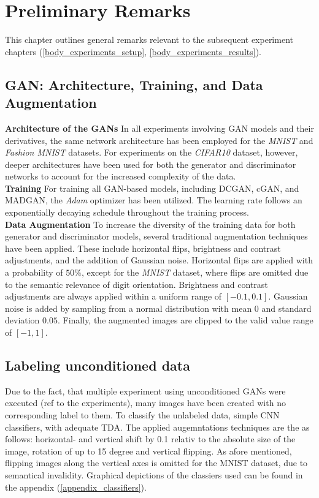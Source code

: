 \section{Preliminary Remarks}\label{body_prelim}
This chapter outlines general remarks relevant to the subsequent experiment chapters (\ref{body_experiments_setup}, \ref{body_experiments_results}).

\subsection{GAN: Architecture, Training, and Data Augmentation}

\noindent\textbf{Architecture of the GANs}
In all experiments involving GAN models and their derivatives, the same network architecture has been employed for the \textit{MNIST} and \textit{Fashion MNIST} datasets. For experiments on the \textit{CIFAR10} dataset, however, deeper architectures have been used for both the generator and discriminator networks to account for the increased complexity of the data.\\

\noindent\textbf{Training}
For training all GAN-based models, including DCGAN, cGAN, and MADGAN, the \textit{Adam} optimizer has been utilized. The learning rate follows an exponentially decaying schedule throughout the training process.\\

\noindent\textbf{Data Augmentation}
To increase the diversity of the training data for both generator and discriminator models, several traditional augmentation techniques have been applied. These include horizontal flips, brightness and contrast adjustments, and the addition of Gaussian noise.
Horizontal flips are applied with a probability of \(50\%\), except for the \textit{MNIST} dataset, where flips are omitted due to the semantic relevance of digit orientation. Brightness and contrast adjustments are always applied within a uniform range of \([-0.1, 0.1]\). Gaussian noise is added by sampling from a normal distribution with mean \(0\) and standard deviation \(0.05\). Finally, the augmented images are clipped to the valid value range of \([-1, 1]\).

\subsection{Labeling unconditioned data}
Due to the fact, that multiple experiment using unconditioned GANs were executed (ref to the experiments), many images have been created with no corresponding label to them. To classify the unlabeled data, simple CNN classifiers, with adequate TDA. The applied augemntations techniques are the as follows: horizontal- and vertical shift by 0.1 relativ to the absolute size of the image, rotation of up to 15 degree and vertical flipping. As afore mentioned, flipping images along the vertical axes is omitted for the MNIST dataset, due to semantical invalidity. Graphical depictions of the classiers used can be found in the appendix (\ref{appendix_classifiers}).



